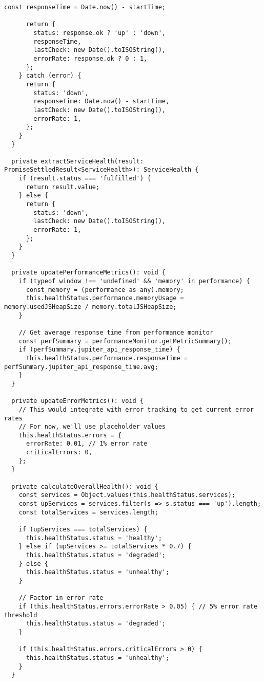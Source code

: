 \documentclass[11pt,a4paper]{article}
\begin{document}
\begin{lstlisting}[style=javascript, caption=Comprehensive Health Monitoring System]
      const responseTime = Date.now() - startTime;
      
      return {
        status: response.ok ? 'up' : 'down',
        responseTime,
        lastCheck: new Date().toISOString(),
        errorRate: response.ok ? 0 : 1,
      };
    } catch (error) {
      return {
        status: 'down',
        responseTime: Date.now() - startTime,
        lastCheck: new Date().toISOString(),
        errorRate: 1,
      };
    }
  }
  
  private extractServiceHealth(result: PromiseSettledResult<ServiceHealth>): ServiceHealth {
    if (result.status === 'fulfilled') {
      return result.value;
    } else {
      return {
        status: 'down',
        lastCheck: new Date().toISOString(),
        errorRate: 1,
      };
    }
  }
  
  private updatePerformanceMetrics(): void {
    if (typeof window !== 'undefined' && 'memory' in performance) {
      const memory = (performance as any).memory;
      this.healthStatus.performance.memoryUsage = memory.usedJSHeapSize / memory.totalJSHeapSize;
    }
    
    // Get average response time from performance monitor
    const perfSummary = performanceMonitor.getMetricSummary();
    if (perfSummary.jupiter_api_response_time) {
      this.healthStatus.performance.responseTime = perfSummary.jupiter_api_response_time.avg;
    }
  }
  
  private updateErrorMetrics(): void {
    // This would integrate with error tracking to get current error rates
    // For now, we'll use placeholder values
    this.healthStatus.errors = {
      errorRate: 0.01, // 1% error rate
      criticalErrors: 0,
    };
  }
  
  private calculateOverallHealth(): void {
    const services = Object.values(this.healthStatus.services);
    const upServices = services.filter(s => s.status === 'up').length;
    const totalServices = services.length;
    
    if (upServices === totalServices) {
      this.healthStatus.status = 'healthy';
    } else if (upServices >= totalServices * 0.7) {
      this.healthStatus.status = 'degraded';
    } else {
      this.healthStatus.status = 'unhealthy';
    }
    
    // Factor in error rate
    if (this.healthStatus.errors.errorRate > 0.05) { // 5% error rate threshold
      this.healthStatus.status = 'degraded';
    }
    
    if (this.healthStatus.errors.criticalErrors > 0) {
      this.healthStatus.status = 'unhealthy';
    }
  }
  

\end{lstlisting}
\end{document}
